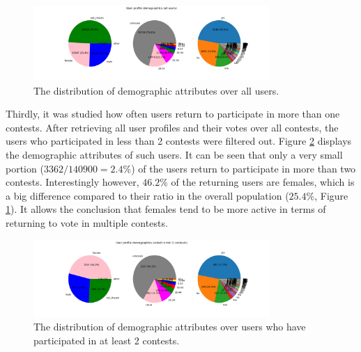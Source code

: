     \begin{figure}[h] 
        \begin{center}
            \includegraphics[width=0.8\textwidth]{Images/user_demographics_distribution.png}
            \caption{The distribution of demographic attributes over all users.}
            \label{user_demographics_distribution}
        \end{center}
    \end{figure}

    Thirdly, it was studied how often users return to participate in more than one contests. After retrieving all user profiles and their votes over all contests, the users who participated in less than 2 contests were filtered out. Figure \ref{user_demographics_distribution-pruned} displays the demographic attributes of such users. It can be seen that only a very small portion ($3362 / 140900 = 2.4 \% $) of the users return to participate in more than two contests. Interestingly however, $46.2 \%$ of the returning users are females, which is a big difference compared to their ratio in the overall population ($25.4 \% $, Figure \ref{user_demographics_distribution}). It allows the conclusion that females tend to be more active in terms of returning to vote in multiple contests. 

    \begin{figure}[h] 
        \begin{center}
            \includegraphics[width=0.8\textwidth]{Images/user_demographics_distribution-pruned}
            \caption{The distribution of demographic attributes over users who have participated in at least 2 contests.}
            \label{user_demographics_distribution-pruned}
        \end{center}
    \end{figure}


